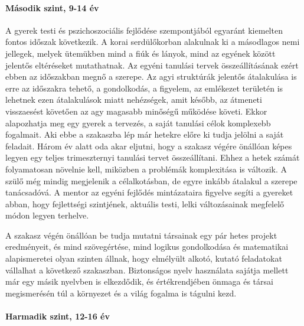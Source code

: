 \paragraph{Második szint, 9-14 év}

A gyerek testi és pszichoszociális fejlődése szempontjából egyaránt
kiemelten fontos időszak következik. A korai serdülőkorban alakulnak ki a
másodlagos nemi jellegek, melyek ütemükben mind a fiúk és lányok, mind az
egyének között jelentős eltéréseket mutathatnak. Az egyéni tanulási tervek
összeállításának ezért ebben az időszakban megnő a szerepe. Az agyi struktúrák
jelentős átalakulása is erre az időszakra tehető, a gondolkodás, a figyelem, az
emlékezet területén is lehetnek ezen átalakulások miatt nehézségek, amit
később, az átmeneti visszaesést követően az agy magasabb minőségű működése
követi. Ekkor alapozhatja meg egy gyerek a tervezés, a saját tanulási célok
komplexebb fogalmait. Aki ebbe a szakaszba lép már hetekre előre ki tudja
jelölni a saját feladait. Három év alatt oda akar eljutni, hogy a szakasz
végére önállóan képes legyen egy teljes trimeszternyi tanulási tervet
összeállítani. Ehhez a hetek számát folyamatosan növelnie kell, miközben a
problémák komplexitása is változik. A szülő még mindig megjelenik a
célalkotásban, de egyre inkább átalakul a szerepe tanácsadóvá. A mentor az
egyéni fejlődés mintázataira figyelve segíti a gyereket abban, hogy fejlettségi
szintjének, aktuális testi, lelki változásainak megfelelő módon legyen
terhelve.

A szakasz végén önállóan be tudja mutatni társainak egy pár hetes projekt
eredményeit, és mind szövegértése, mind logikus gondolkodása és matematikai
alapismeretei olyan szinten állnak, hogy elmélyült alkotó, kutató feladatokat
vállalhat a következő szakaszban. Biztonságos nyelv használata sajátja mellett
már egy másik nyelvben is elkezdődik, és értékrendjében önmaga és társai
megismerésén túl a környezet és a világ fogalma is tágulni kezd.

\paragraph{Harmadik szint, 12-16 év}

